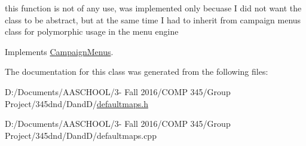 this function is not of any use, was implemented only becuase I did not want the class to be abstract, but at the same time I had to inherit from campaign menus class for polymorphic usage in the menu engine 

Implements \hyperlink{class_campaign_menus}{Campaign\+Menus}.



The documentation for this class was generated from the following files\+:\begin{DoxyCompactItemize}
\item 
D\+:/\+Documents/\+A\+A\+S\+C\+H\+O\+O\+L/3-\/ Fall 2016/\+C\+O\+M\+P 345/\+Group Project/345dnd/\+Dand\+D/\hyperlink{defaultmaps_8h}{defaultmaps.\+h}\item 
D\+:/\+Documents/\+A\+A\+S\+C\+H\+O\+O\+L/3-\/ Fall 2016/\+C\+O\+M\+P 345/\+Group Project/345dnd/\+Dand\+D/defaultmaps.\+cpp\end{DoxyCompactItemize}
